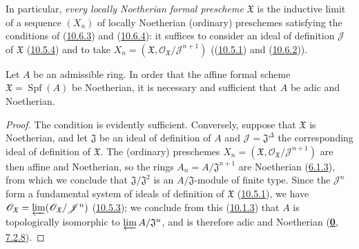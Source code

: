 In particular, \emph{every locally Noetherian formal prescheme
$\mathfrak{X}$} is the inductive limit of a sequence $(X_n)$ of locally
Noetherian (ordinary) preschemes satisfying the conditions of
(\hyperref[I.10.6.3]{10.6.3}) and
(\hyperref[I.10.6.4]{10.6.4}): it suffices to consider an ideal of
definition $\mathscr{J}$ of $\mathfrak{X}$
(\hyperref[I.10.5.4]{10.5.4}) and to take
$X_n=(\mathfrak{X},
\mathscr{O}_{\mathfrak{X}}/\mathscr{J}^{n+1})$
((\hyperref[I.10.5.1]{10.5.1}) and
(\hyperref[I.10.6.2]{10.6.2})).

\begin{corollary}[10.6.5]
\label{I.10.6.5}
Let $A$ be an admissible ring. In order that the affine formal scheme
$\mathfrak{X}=\operatorname{Spf}(A)$ be Noetherian, it is necessary and
sufficient that $A$ be adic and Noetherian.
\end{corollary}

\begin{proof}
The condition is evidently sufficient. Conversely, suppose that
$\mathfrak{X}$ is Noetherian, and let $\mathfrak{J}$ be an ideal of
definition of $A$ and $\mathscr{J}=\mathfrak{J}^\Delta$ the corresponding
ideal of definition of $\mathfrak{X}$. The (ordinary) preschemes
$X_n=(\mathfrak{X},
\mathscr{O}_{\mathfrak{X}}/\mathscr{J}^{n+1})$ are then affine and
Noetherian, so the rings
$A_n=A/\mathfrak{J}^{n+1}$ are Noetherian
(\hyperref[I.6.1.3]{6.1.3}), from which we conclude that
$\mathfrak{J}/\mathfrak{J}^2$ is an $A/\mathfrak{J}$-module of finite
type. Since the $\mathscr{J}^n$ form a fundamental system of ideals
of definition of $\mathfrak{X}$
(\hyperref[I.10.5.1]{10.5.1}), we have
$\mathscr{O}_{\mathfrak{X}}
=\varprojlim(\mathscr{O}_{\mathfrak{X}}/\mathscr{J}^n)$
(\hyperref[I.10.5.3]{10.5.3}); we conclude from this
(\hyperref[I.10.1.3]{10.1.3}) that $A$ is topologically isomorphic to
$\varprojlim A/\mathfrak{J}^n$, and is therefore adic and Noetherian
(\hyperref[0.7.2.8]{\textbf{0}, 7.2.8}).
\end{proof}

